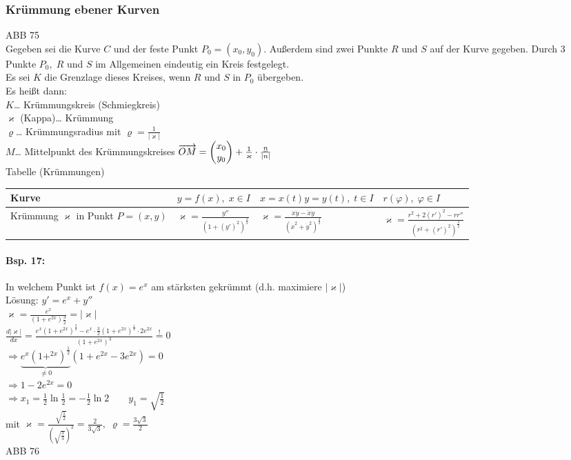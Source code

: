 \subsubsection{Krümmung ebener Kurven}
ABB 75\\
Gegeben sei die Kurve $C$ und der feste Punkt $P_0=(x_0, y_0)$. Außerdem sind zwei Punkte $R$ und $S$ auf der Kurve gegeben. Durch 3 Punkte $P_0, \; R$ und $S$ im Allgemeinen eindeutig ein Kreis festgelegt.\\
Es sei $K$ die Grenzlage dieses Kreises, wenn $R$ und $S$ in $P_0$ übergeben.\\
Es heißt dann:\\
$K$… Krümmungskreis (Schmiegkreis)\\
$\varkappa$ (Kappa)… Krümmung\\
$\varrho$… Krümmungsradius mit $\varrho=\frac{1}{|\varkappa|}$\\
$M$… Mittelpunkt des Krümmungskreises $\overrightarrow{OM}=\begin{pmatrix}x_0 \\ y_0\end{pmatrix}+\frac{1}{\varkappa}\cdot \frac{\underline{n}}{|n|}$\\
Tabelle (Krümmungen)\\
\begin{tabular}{l | l | L{.2} | l}
Kurve & $y=f(x),\;x\in I$ & $x=x(t)$\newline $y=y(t), \; t\in I$ & $r(\varphi), \; \varphi \in I$ \\
\hline 
Krümmung $\varkappa$ in Punkt $P=(x,y)$ & $\varkappa=\frac{y''}{(1+(y')^2)^{\tfrac{3}{2}}}$ & $\varkappa=\frac{\dot{x}\ddot{y}-\ddot{x}\dot{y}}{(\dot{x}^2+\dot{y}^2)^{\tfrac{3}{2}}}$ & $\varkappa=\frac{r^2+2(r')^2-rr''}{(r^2+(r')^2)^{\tfrac{3}{2}}}$
\end{tabular}
\paragraph{Bsp. 17:} In welchem Punkt ist $f(x)=e^x$ am stärksten gekrümmt (d.h. maximiere $|\varkappa|$)\\
Lösung: $y'=e^x+y''$\\
$\varkappa=\frac{e^x}{(1+e^{2x}){\tfrac{3}{2}}}=|\varkappa|$\\
$\frac{d|\varkappa|}{dx}=\frac{e^x(1+e^{2x})^{\tfrac{3}{2}}-e^x\cdot\frac{3}{2}(1+e^{2x})^{\tfrac{1}{2}}\cdot 2e^{2x}}{(1+e^{2x})^3}\overset{!}{=}0$\\
$\Rightarrow\underbrace{e^x(1+^{2x})^{\tfrac{1}{2}}}_{\not = 0}(1+e^{2x}-3e^{2x})=0$\\
$\Rightarrow 1-2e^{2x}=0$\\
$\Rightarrow x_1 = \frac{1}{2}\ln \tfrac{1}{2}=-\frac{1}{2}\ln 2 \qquad y_1=\sqrt{\frac{1}{2}}$\\
mit $\varkappa = \frac{\sqrt{\frac{1}{2}}}{\left(\sqrt{\frac{3}{3}}\right)^3}=\frac{2}{3\sqrt{3}}, \; \varrho=\frac{3\sqrt{3}}{2}$\\
ABB 76









